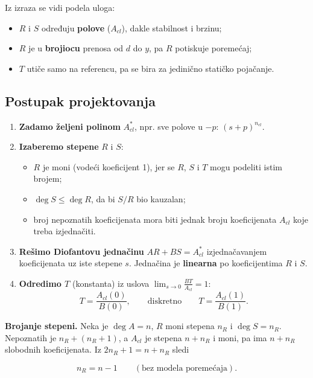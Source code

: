 \documentclass[11pt,a4paper,parskip=half,headsepline,numbers=noenddot]{scrartcl}
\providecommand{\tightlist}{}
\begin{document}
Iz izraza se vidi podela uloga:

\begin{itemize}
\item \(R\) i \(S\) određuju \textbf{polove} (\(A_{cl}\)), dakle stabilnost i brzinu;
\item \(R\) je u \textbf{brojiocu} prenosa od \(d\) do \(y\), pa \(R\) potiskuje poremećaj;
\item \(T\) utiče samo na referencu, pa se bira za jedinično statičko pojačanje.
\end{itemize}

\subsection{Postupak projektovanja}

\begin{enumerate}
\def\labelenumi{\arabic{enumi}.}
\item \textbf{Zadamo željeni polinom} \(A_{cl}^*\), npr. sve polove u \(-p\): \((s + p)^{n_{cl}}\).
\item \textbf{Izaberemo stepene} \(R\) i \(S\):

  \begin{itemize}
  \tightlist
  \item \(R\) je moni (vodeći koeficijent 1), jer se \(R\), \(S\) i \(T\) mogu podeliti istim brojem;
  \item \(\deg S \le \deg R\), da bi \(S/R\) bio kauzalan;
  \item broj nepoznatih koeficijenata mora biti jednak broju koeficijenata \(A_{cl}\) koje treba izjednačiti.
  \end{itemize}
\item \textbf{Rešimo Diofantovu jednačinu} \(AR + BS = A_{cl}^*\) izjednačavanjem koeficijenata uz iste stepene \(s\). Jednačina je \textbf{linearna} po koeficijentima \(R\) i \(S\).
\item \textbf{Odredimo \(T\)} (konstanta) iz uslova \(\lim_{s\to 0}\frac{BT}{A_{cl}} = 1\):
  \[T = \frac{A_{cl}(0)}{B(0)},\qquad\text{diskretno}\qquad T = \frac{A_{cl}(1)}{B(1)} .\]
\end{enumerate}

\textbf{Brojanje stepeni.} Neka je \(\deg A = n\), \(R\) moni stepena \(n_R\) i \(\deg S = n_R\). Nepoznatih je \(n_R + (n_R + 1)\), a \(A_{cl}\) je stepena \(n + n_R\) i moni, pa ima \(n + n_R\) slobodnih koeficijenata. Iz \(2n_R + 1 = n + n_R\) sledi

\[n_R = n - 1 \qquad(\text{bez modela poremećaja}).\]
\end{document}
